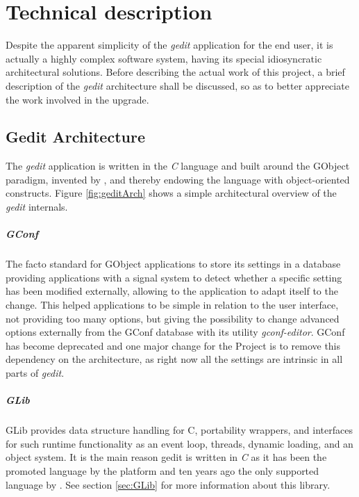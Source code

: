 \chapter{Technical description}


Despite the apparent simplicity of the \emph{gedit} application for the end user, it 
is actually a highly complex software system, having its special idiosyncratic 
architectural solutions.   Before describing the actual work of this project, a brief 
description of the \emph{gedit} architecture shall be discussed, so as to better appreciate 
the work involved in the upgrade.


\section{Gedit Architecture}

The \emph{gedit} application is written in the \emph{C} language and built around the 
GObject paradigm, invented by \GNOME, and thereby endowing the language with object-oriented constructs. 
Figure \ref{fig:geditArch} shows a simple architectural overview of the \emph{gedit} internals.


\paragraph{GConf}

The facto standard for GObject applications to store its settings in a database 
providing applications with a signal system to detect whether a specific setting 
has been modified externally, allowing to the application to adapt itself to the 
change. This helped \GNOME applications to be simple in relation to the user interface, 
not providing too many options, but giving the possibility to change advanced options 
externally from the GConf database with its utility \emph{gconf-editor}.
GConf has become deprecated and one major change for the Project is to remove 
this dependency on the architecture, as right now all the settings are intrinsic 
in all parts of \emph{gedit}.

\paragraph{GLib}

GLib provides data structure handling for C, portability wrappers, and interfaces 
for such runtime functionality as an event loop, threads, dynamic loading, and an object 
system. It is the main reason gedit is written in \emph{C} as it has been the 
promoted language by the platform and ten years ago the only supported language 
by \GNOME. See section \ref{sec:GLib} for more information about this library.


